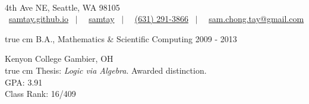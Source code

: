 \documentclass[11pt,article,oneside]{memoir}
\makeatletter
\def\myemail{sam.chong.tay@gmail.com}
\def\myweb{https://samtay.github.io}
\def\myphone{(631) 291-3866}
\def\mygithub{samtay}
\makeatother
\begin{document}
\renewcommand{\labelitemi}{~}

\def\ind{\hangindent=1 true cm\hangafter=1 \noindent}
\def\labelitemi{~}
\renewcommand{\labelitemii}{~}


\pagestyle{kjh}


\begin{center}
 \\
\vspace{.6em}

\footnotesize
   4th Ave NE, Seattle, \textsc{WA} 98105 \\
  \vspace{.3em}
  \faGlobe \, \href{\myweb}{samtay.github.io}
  $\enspace | \enspace$
  \faGithub \, \href{https://github.com/samtay}{\mygithub}
  $\enspace | \enspace$
  \faPhone \, \href{tel:\myphone}{\myphone}
  $\enspace | \enspace$
  \faEnvelope \, \href{mailto:\myemail}{\myemail}
\normalsize
\end{center}

\bigskip

\reversemarginpar


\ind B.A., Mathematics \& Scientific Computing \hfill {\small 2009 - 2013}

\noindent Kenyon College \hfill {\small Gambier, OH} \\
\ind \footnotesize
  Thesis: \emph{Logic via Algebra}. Awarded distinction. \\
  GPA: 3.91 \\
  Class Rank: 16/409
\normalsize
\vspace{0.05in}
\end{document}
